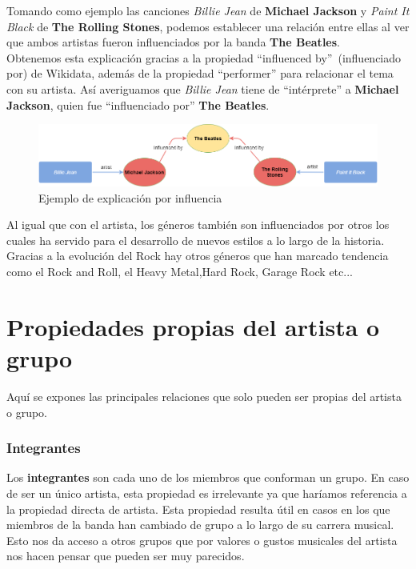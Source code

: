 Tomando como ejemplo las canciones \textit{Billie Jean} de \textbf{Michael Jackson} y \textit{Paint It Black} de \textbf{The Rolling Stones}, podemos establecer una relación entre ellas al ver que ambos artistas fueron influenciados por la banda \textbf{The Beatles}.\\

Obtenemos esta explicación gracias a la propiedad ``influenced by''~(influenciado por) de Wikidata, además de la propiedad ``performer'' para relacionar el tema con su artista. Así averiguamos que \textit{Billie Jean} tiene de ``intérprete'' a \textbf{Michael Jackson}, quien fue ``influenciado por'' \textbf{The Beatles}.\\

\begin{figure}[h!]
	\centering
	\includegraphics[width = 1\textwidth]{Imagenes/Bitmap/Influencia ejemplo.png}
	\caption{Ejemplo de explicación por influencia}
	\label{fig:sampleImage}
\end{figure}

Al igual que con el artista, los géneros también son influenciados por otros los cuales ha servido para el desarrollo de nuevos estilos a lo largo de la historia. Gracias a la evolución del Rock hay otros géneros que han marcado tendencia como el Rock and Roll, el Heavy Metal,Hard Rock, Garage Rock etc...\\

\section{Propiedades propias del artista o grupo}

Aquí se expones las principales relaciones que solo pueden ser propias del artista o grupo.\\

\subsubsection*{Integrantes}

Los \textbf{integrantes} son cada uno de los miembros que conforman un grupo. En caso de ser un único artista, esta propiedad es irrelevante ya que haríamos referencia a la propiedad directa de artista. Esta propiedad resulta útil en casos en los que miembros de la banda han cambiado de grupo a lo largo de su carrera musical. Esto nos da acceso a otros grupos que por valores o gustos musicales del artista nos hacen pensar que pueden ser muy parecidos.\\


